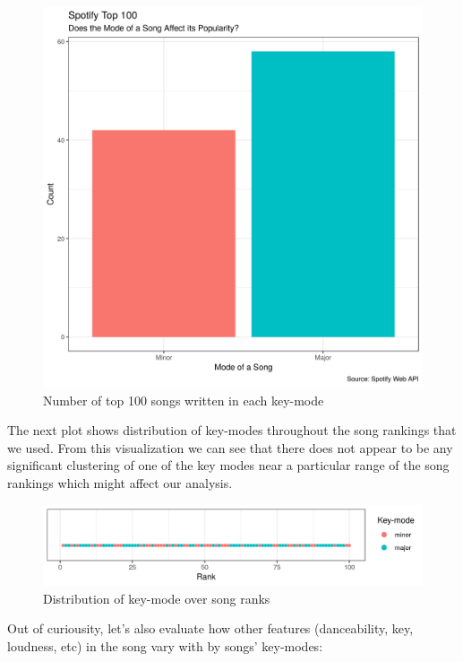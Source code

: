 \documentclass[]{article}
\begin{document}
\begin{figure}[H]
\includegraphics[width=0.8\linewidth]{../results/figure/Fig01_Mode_Viz} \caption{Number of top 100 songs written in each key-mode}\label{fig:unnamed-chunk-1}
\end{figure}

The next plot shows distribution of key-modes throughout the song
rankings that we used. From this visualization we can see that there
does not appear to be any significant clustering of one of the key modes
near a particular range of the song rankings which might affect our
analysis.

\begin{figure}[H]
\includegraphics[width=1\linewidth]{../results/figure/Fig05_Mode_Over_Rank_Plot} \caption{Distribution of key-mode over song ranks}\label{fig:unnamed-chunk-2}
\end{figure}

Out of curiousity, let's also evaluate how other features (danceability,
key, loudness, etc) in the song vary with by songs' key-modes:
\end{document}
